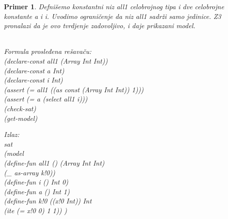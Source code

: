 \documentclass[12pt,oneside]{memoir}
\newtheorem{primer}{Primer}
\begin{document}
\begin{primer} Defnišemo konstantni niz all1 celobrojnog tipa i dve celobrojne konstante a i i. Uvodimo ograničenje da niz all1 sadrži samo jedinice. Z3 pronalazi da je ovo tvrdjenje zadovoljivo, i daje prikazani model.\\ \\
\begin{minipage}[b]{0.5\textwidth}
Formula prosleđena rešavaču:
\\(declare-const all1 (Array Int Int))
\\(declare-const a Int)
\\(declare-const i Int)
\\(assert (= all1 ((as const (Array Int Int)) 1)))
\\(assert (= a (select all1 i)))
\\(check-sat)
\\(get-model)
\end{minipage}
\hspace{1.5cm} 
\begin{minipage}[b]{0.5\textwidth}
Izlaz:
\\sat 
\\(model 
\\(define-fun all1 () (Array Int Int) 
\\(\_ as-array k!0)) 
\\(define-fun i () Int 0) 
\\(define-fun a () Int 1) 
\\(define-fun k!0 ((x!0 Int)) Int 
\\(ite (= x!0 0) 1 1)) )
\end{minipage}
\end{primer}
\end{document}

